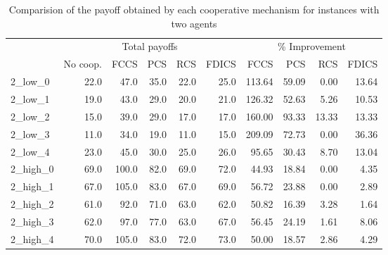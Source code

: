 \documentclass{article}
\begin{document}
\begin{table}[ht!]
\centering
\caption{Comparision of the payoff obtained by each cooperative mechanism for instances with two agents \label{tb:2_payoffs}}
\begin{adjustbox}{max width=\textwidth}
\begin{tabular}{lrrrrrrrrr}
\toprule & \multicolumn{5}{c}{Total payoffs}            & \multicolumn{4}{|c}{\% Improvement} \\
           & No coop. & FCCS  & PCS  & RCS  & FDICS &\multicolumn{1}{|r}{FCCS}    & PCS    & RCS    & FDICS   \\
\midrule
2\_low\_0  & 22.0     & 47.0  & 35.0 & 22.0 & 25.0 & 113.64  & 59.09  & 0.00   & 13.64  \\
2\_low\_1  & 19.0     & 43.0  & 29.0 & 20.0 & 21.0 & 126.32  & 52.63  & 5.26   & 10.53  \\
2\_low\_2  & 15.0     & 39.0  & 29.0 & 17.0 & 17.0 & 160.00  & 93.33  & 13.33  & 13.33  \\
2\_low\_3  & 11.0     & 34.0  & 19.0 & 11.0 & 15.0 & 209.09  & 72.73  & 0.00   & 36.36  \\
2\_low\_4  & 23.0     & 45.0  & 30.0 & 25.0 & 26.0 & 95.65   & 30.43  & 8.70   & 13.04  \\
2\_high\_0 & 69.0     & 100.0 & 82.0 & 69.0 & 72.0 & 44.93   & 18.84  & 0.00   & 4.35   \\
2\_high\_1 & 67.0     & 105.0 & 83.0 & 67.0 & 69.0 & 56.72   & 23.88  & 0.00   & 2.89   \\
2\_high\_2 & 61.0     & 92.0  & 71.0 & 63.0 & 62.0 & 50.82   & 16.39  & 3.28   & 1.64   \\
2\_high\_3 & 62.0     & 97.0  & 77.0 & 63.0 & 67.0 & 56.45   & 24.19  & 1.61   & 8.06   \\
2\_high\_4 & 70.0     & 105.0 & 83.0 & 72.0 & 73.0 & 50.00   & 18.57  & 2.86   & 4.29  \\
\bottomrule
\end{tabular}
\end{adjustbox}
\end{table}
\end{document}
